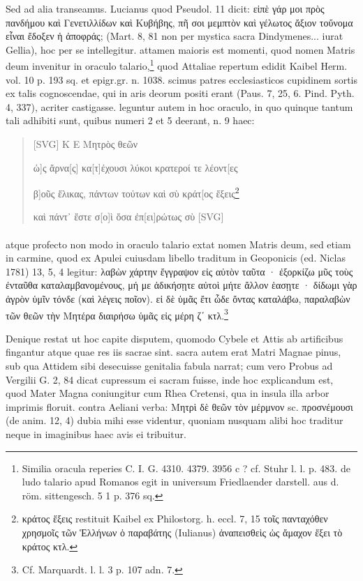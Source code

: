 \documentclass[a4paper, 11pt, oneside, polutonikogreek, german]{article}
\begin{document}
Sed ad alia transeamus. Lucianus quod Pseudol. 11 dicit: εἰπὲ γάρ μοι πρὸς πανδήμου καὶ Γενετιλλίδων καὶ Κυβήβης, πῆ σοι μεμπτὸν καὶ γέλωτος ἄξιον τοὔνομα εἶναι ἔδοξεν ἡ ἀποφράς; (Mart. 8, 81 non per mystica sacra Dindymenes... iurat Gellia), hoc per se intellegitur. attamen maioris est momenti, quod nomen Matris deum invenitur in oraculo talario,\footnote{Similia oracula reperies C. I. G. 4310. 4379. 3956 c ? cf. Stuhr l. l. p. 483. de ludo talario apud Romanos egit in universum Friedlaender darstell. aus d. röm. sittengesch. 5 1 p. 376 sq.} quod Attaliae repertum edidit Kaibel Herm. vol. 10 p. 193 sq. et epigr.gr. n. 1038. scimus patres ecclesiasticos cupidinem sortis ex talis cognoscendae, qui in aris deorum positi erant (Paus. 7, 25, 6. Pind. Pyth. 4, 337), acriter castigasse. leguntur autem in hoc oraculo, in quo quinque tantum tali adhibiti sunt, quibus numeri 2 et 5 deerant, n. 9 haec:
\begin{quotation}
[SVG] K E Μητρὸς θεῶν

ὡ]ς ἄρνα[ς] κα[τ]έχουσι λύκοι κρατεροί τε λέοντ[ες

β]οῦς ἕλικας, πάντων τούτων καὶ σὺ κράτ[ος ἕξεις\footnote{κράτος ἕξεις restituit Kaibel ex Philostorg. h. eccl. 7, 15 τοῖς πανταχόθεν χρησμοῖς τῶν Ἑλλήνων ὁ παραβάτης (Iulianus) ἀναπεισθεὶς ὡς ἄμαχον ἕξει τὸ κράτος κτλ.}

καὶ πάντ᾽ ἔστε σ[ο]ὶ ὅσα ἐπ[ει]ρώτως σὺ [SVG]
\end{quotation}
\paragraph{}
atque profecto non modo in oraculo talario extat nomen Matris deum, sed etiam in carmine, quod ex Apulei cuiusdam libello traditum in Geoponicis (ed. Niclas 1781) 13, 5, 4 legitur: λαβὼν χάρτην ἔγγραψον εἰς αὐτὸν ταῦτα · ἐξορκίζω μῦς τοὺς ἐνταῦθα καταλαμβανομένους, μή με ἀδικήσῃτε αὐτοὶ μήτε ἄλλον ἑασῃτε · δίδωμι γὰρ ἀγρὸν ὑμῖν τόνδε (καὶ λέγεις ποῖον). εἰ δὲ ὑμᾶς ἔτι ὧδε ὄντας καταλάβω, παραλαβὼν τῶν θεῶν τὴν Μητέρα διαιρήσω ὑμᾶς εἰς μέρη ζ΄ κτλ.\footnote{Cf. Marquardt. l. l. 3 p. 107 adn. 7.}

Denique restat ut hoc capite disputem, quomodo Cybele et Attis ab artificibus fingantur atque quae res iis sacrae sint. sacra autem erat Matri Magnae pinus, sub qua Attidem sibi desecuisse genitalia fabula narrat; cum vero Probus ad Vergilii G. 2, 84 dicat cupressum ei sacram fuisse, inde hoc explicandum est, quod Mater Magna coniungitur cum Rhea Cretensi, qua in insula illa arbor imprimis floruit. contra Aeliani verba: Μητρὶ δὲ θεῶν τὸν μέρμνον sc. προσνέμουσι (de anim. 12, 4) dubia mihi esse videntur, quoniam nusquam alibi hoc traditur neque in imaginibus haec avis ei tribuitur.
\end{document}
